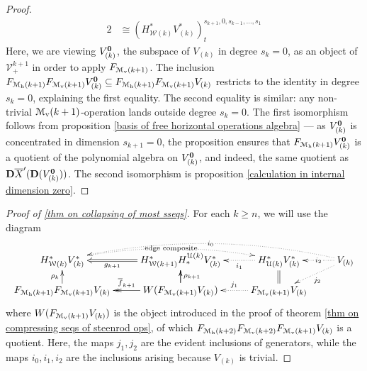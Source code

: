 \documentclass[11pt]{amsart}
\theoremstyle{plain}
\theoremstyle{definition}
\newcommand{\calU}{\mathcal{U}}
\newcommand{\calV}{\mathcal{V}}
\newcommand{\calM}{\mathcal{M}}
\newcommand{\calw}{\mathcal{W}}
\newcommand{\calMv}{\mathcal{M}_\textup{v}}
\newcommand{\calMh}{\mathcal{M}_\textup{h}}
\theoremstyle{plain}
\newcommand{\vect}[2]{\calV^{#1}_{#2}}
\newcommand{\UEAX}{\overline{X}'}%
\newcommand{\dual}{\mathbf{D}}
\begin{document}
\begin{Calculations of HWn for n nonzero}
\begin{proof}
\begin{alignat*}{2}
&\cong (H^*_{\calw(k)}V^*_{(k)})^{s_{k+1},0,s_{k-1},\ldots,s_1}_{t}
\end{alignat*}
Here, we are viewing $V_{(k)}^{\textbf{\textup{0}}}$, the subspace of $V_{(k)}$ in degree $s_k=0$, as an object of $\vect{k+1}{+}$ in order to apply $F_{\calMv(k+1)}$. The inclusion $F_{\calM_{\textup{h}}(k+1)}F_{\calM_{\textup{v}}(k+1)}V_{(k)}^{\textbf{\textup{0}}}\subseteq F_{\calM_{\textup{h}}(k+1)}F_{\calM_{\textup{v}}(k+1)}V_{(k)}$ restricts to the identity in degree $s_k=0$, explaining the first equality. The second equality is similar: any non-trivial $\calMv(k+1)$-operation lands outside degree $s_k=0$. The first isomorphism follows from proposition \ref{basis of free horizontal operations algebra} --- as $V_{(k)}^{\textbf{\textup{0}}}$ is concentrated in dimension $s_{k+1}=0$, the proposition ensures that $F_{\calM_{\textup{h}}(k+1)}V_{(k)}^{\textbf{\textup{0}}}$ is a quotient of the polynomial algebra on $V_{(k)}^{\textbf{\textup{0}}}$, and indeed, the same quotient as $\dual\UEAX(\dual(V_{(k)}^{\textbf{\textup{0}}}))$. The second isomorphism is proposition \ref{calculation in internal dimension zero}.
\end{proof}
\begin{proof}[Proof of \ref{thm on collapsing of most sseqs}]
For each $k\geq n$, we will use the diagram
\[\xymatrix@R=4mm{
H^*_{\calw(k)}V^*_{(k)}\ar@{..>}@/^1.22em/[rr]|-{\textup{\,edge composite\,}}
&H^*_{\calw(k+1)}H_*^{\calU(k)}V^*_{(k)}\ar@{=>}[l]^-{g_{k+1}}%
&H^*_{\calU(k)}V^*_{(k)}\ar@{..>}[l]^-{i_1}
&V_{(k)}\ar@{..>}[l]|-{\,i_2\,}\ar@{..>}[ld]^-{j_2}\ar@{..>}@/_1.72em/[lll]|-{\,i_0\,}
\\
F_{\calM_{\textup{h}}(k+1)}F_{\calM_{\textup{v}}(k+1)}V_{(k)}\ar[u]^-{\rho_k}
&W(F_{\calMv(k+1)}V_{(k)})\ar[u]\ar@{->>}[l]_-{\overline{f}_{k+1}}\ar[u]_-{\rho_{k+1}}
&F_{\calMv(k+1)}V_{(k)}\ar@{..>}[l]_-{j_1}\ar@{=}[u]%
}\]
where $W(F_{\calMv(k+1)}V_{(k)})$ is the object introduced in the proof of theorem \ref{thm on compressing seqs of steenrod ops}, of which $F_{\calM_{\textup{h}}(k+2)}F_{\calM_{\textup{v}}(k+2)}F_{\calMv(k+1)}V_{(k)}$ is a quotient. Here, the maps $j_1,j_2$ are the evident inclusions of generators, while the maps $i_0,i_1,i_2$ are the inclusions arising because $V_{(k)}$ is trivial.


\end{proof}
\end{Calculations of HWn for n nonzero}
\end{document}
